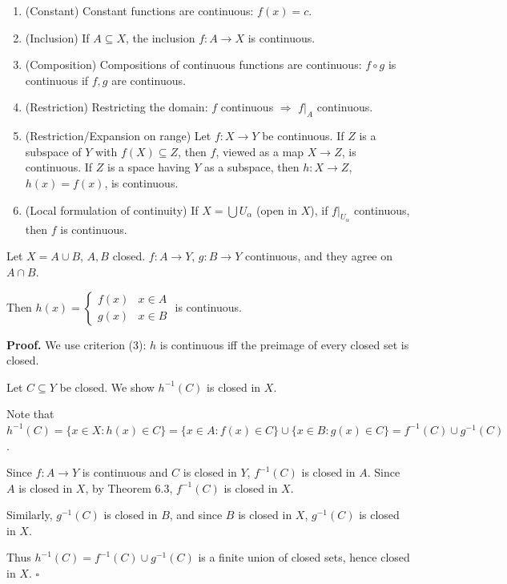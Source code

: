 \documentclass[11pt]{report}
\renewenvironment{proof}[1][Proof]{\noindent\textbf{#1.} }{\hfill$\square$\par\vspace{5pt}}
\begin{document}
\begin{thmbox}
\begin{enumerate}
    \item (Constant) Constant functions are continuous: $f(x) = c$.
    \item (Inclusion) If $A \subseteq X$, the inclusion $f: A \to X$ is continuous.
    \item (Composition) Compositions of continuous functions are continuous: $f \circ g$ is continuous if $f, g$ are continuous.
    \item (Restriction) Restricting the domain: $f$ continuous $\Rightarrow$ $f|_A$ continuous.
    \item (Restriction/Expansion on range) Let $f: X \to Y$ be continuous. If $Z$ is a subspace of $Y$ with $f(X) \subseteq Z$, then $f$, viewed as a map $X \to Z$, is continuous. If $Z$ is a space having $Y$ as a subspace, then $h: X \to Z$, $h(x) = f(x)$, is continuous.
    \item (Local formulation of continuity) If $X = \bigcup U_\alpha$ (open in $X$), if $f|_{U_\alpha}$ continuous, then $f$ is continuous.
\end{enumerate}
\end{thmbox}

\begin{thmbox}
Let $X = A \cup B$, $A, B$ closed. $f: A \to Y$, $g: B \to Y$ continuous, and they agree on $A \cap B$.

Then $h(x) = \begin{cases} f(x) & x \in A \\ g(x) & x \in B \end{cases}$ is continuous.
\end{thmbox}

\begin{proof}
We use criterion (3): $h$ is continuous iff the preimage of every closed set is closed.

Let $C \subseteq Y$ be closed. We show $h^{-1}(C)$ is closed in $X$.

Note that $h^{-1}(C) = \{x \in X : h(x) \in C\} = \{x \in A : f(x) \in C\} \cup \{x \in B : g(x) \in C\} = f^{-1}(C) \cup g^{-1}(C)$.

Since $f: A \to Y$ is continuous and $C$ is closed in $Y$, $f^{-1}(C)$ is closed in $A$. Since $A$ is closed in $X$, by Theorem 6.3, $f^{-1}(C)$ is closed in $X$.

Similarly, $g^{-1}(C)$ is closed in $B$, and since $B$ is closed in $X$, $g^{-1}(C)$ is closed in $X$.

Thus $h^{-1}(C) = f^{-1}(C) \cup g^{-1}(C)$ is a finite union of closed sets, hence closed in $X$.
\end{proof}
\end{document}
